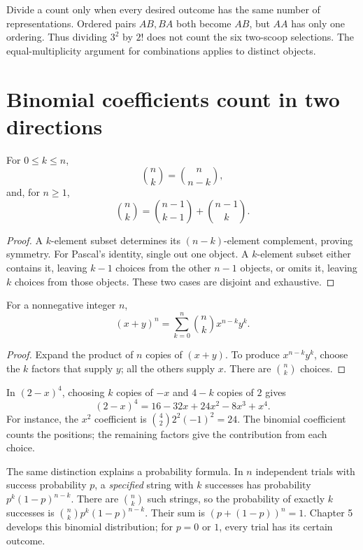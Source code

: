 \begin{warningbox}
Divide a count only when every desired outcome has the same number of
representations. Ordered pairs $AB,BA$ both become $AB$, but $AA$ has
only one ordering. Thus dividing $3^2$ by $2!$ does not count the six
two-scoop selections. The equal-multiplicity argument for combinations
applies to distinct objects.
\end{warningbox}

\section{Binomial coefficients count in two directions}

\begin{proposition}
For $0\le k\le n$,
\[
\binom nk=\binom n{n-k},
\]
and, for $n\ge1$,
\[
\binom nk=\binom{n-1}{k-1}+\binom{n-1}{k}.
\]
\end{proposition}
\begin{proof}
A $k$-element subset determines its $(n-k)$-element complement, proving
symmetry. For Pascal's identity, single out one object. A $k$-element
subset either contains it, leaving $k-1$ choices from the other $n-1$
objects, or omits it, leaving $k$ choices from those objects. These two
cases are disjoint and exhaustive.
\end{proof}

\begin{theorem}
For a nonnegative integer $n$,
\[
  (x+y)^n=\sum_{k=0}^n\binom nk x^{n-k}y^k.
\]
\end{theorem}
\begin{proof}
Expand the product of $n$ copies of $(x+y)$. To produce $x^{n-k}y^k$,
choose the $k$ factors that supply $y$; all the others supply $x$.
There are $\binom nk$ choices.
\end{proof}

\begin{example}
In $(2-x)^4$, choosing $k$ copies of $-x$ and $4-k$ copies of $2$ gives
\[
 (2-x)^4=16-32x+24x^2-8x^3+x^4.
\]
For instance, the $x^2$ coefficient is $\binom42 2^2(-1)^2=24$.
The binomial coefficient counts the positions; the remaining factors
give the contribution from each choice.
\end{example}

The same distinction explains a probability formula. In $n$ independent
trials with success probability $p$, a \emph{specified} string with $k$
successes has probability $p^k(1-p)^{n-k}$. There are $\binom nk$ such
strings, so the probability of exactly $k$ successes is
$\binom nk p^k(1-p)^{n-k}$. Their sum is
$(p+(1-p))^n=1$. Chapter 5 develops this binomial distribution; for
$p=0$ or $1$, every trial has its certain outcome.

